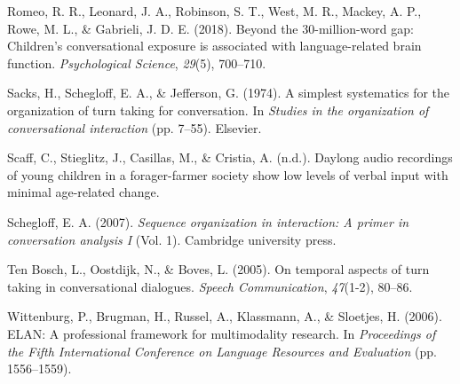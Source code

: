 \documentclass[10pt, letterpaper]{article}
\begin{document}
\leavevmode\hypertarget{ref-romeo2018beyond}{}%
Romeo, R. R., Leonard, J. A., Robinson, S. T., West, M. R., Mackey, A.
P., Rowe, M. L., \& Gabrieli, J. D. E. (2018). Beyond the
30-million-word gap: Children's conversational exposure is associated
with language-related brain function. \emph{Psychological Science},
\emph{29}(5), 700--710.

\leavevmode\hypertarget{ref-sacks1974simplest}{}%
Sacks, H., Schegloff, E. A., \& Jefferson, G. (1974). A simplest
systematics for the organization of turn taking for conversation. In
\emph{Studies in the organization of conversational interaction} (pp.
7--55). Elsevier.

\leavevmode\hypertarget{ref-scaffIPlanguage}{}%
Scaff, C., Stieglitz, J., Casillas, M., \& Cristia, A. (n.d.). Daylong
audio recordings of young children in a forager-farmer society show low
levels of verbal input with minimal age-related change.

\leavevmode\hypertarget{ref-schegloff2007sequence}{}%
Schegloff, E. A. (2007). \emph{Sequence organization in interaction: A
primer in conversation analysis I} (Vol. 1). Cambridge university press.

\leavevmode\hypertarget{ref-ten2005temporal}{}%
Ten Bosch, L., Oostdijk, N., \& Boves, L. (2005). On temporal aspects of
turn taking in conversational dialogues. \emph{Speech Communication},
\emph{47}(1-2), 80--86.

\leavevmode\hypertarget{ref-ELAN}{}%
Wittenburg, P., Brugman, H., Russel, A., Klassmann, A., \& Sloetjes, H.
(2006). ELAN: A professional framework for multimodality research. In
\emph{Proceedings of the Fifth International Conference on Language
Resources and Evaluation} (pp. 1556--1559).


\end{document}
